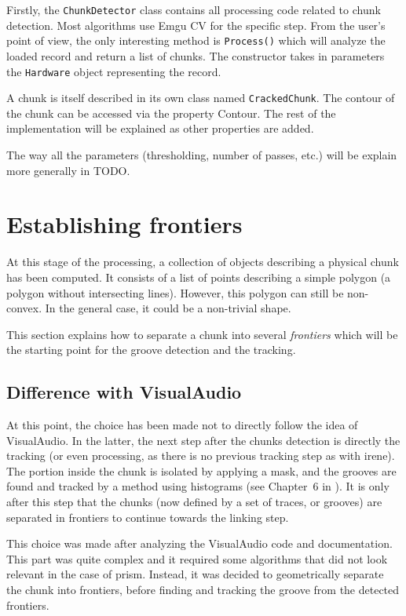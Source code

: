 Firstly, the \texttt{ChunkDetector} class contains all processing code related to chunk detection. Most algorithms use Emgu CV for the specific step. From the user's point of view, the only interesting method is \texttt{Process()} which will analyze the loaded record and return a list of chunks. The constructor takes in parameters the \texttt{Hardware} object representing the record.

A chunk is itself described in its own class named \texttt{CrackedChunk}. The contour of the chunk can be accessed via the property Contour. The rest of the implementation will be explained as other properties are added.

The way all the parameters (thresholding, number of passes, etc.) will be explain more generally in TODO.

\section{Establishing frontiers}
\label{sec:findfrontiers}

At this stage of the processing, a collection of objects describing a physical chunk has been computed. It consists of a list of points describing a simple polygon (a polygon without intersecting lines). However, this polygon can still be non-convex. In the general case, it could be a non-trivial shape.

This section explains how to separate a chunk into several \emph{frontiers} which will be the starting point for the groove detection and the tracking.

\subsection{Difference with VisualAudio}

At this point, the choice has been made not to directly follow the idea of VisualAudio. In the latter, the next step after the chunks detection is directly the tracking (or even processing, as there is no previous tracking step as with \gls{irene}). The portion inside the chunk is isolated by applying a mask, and the grooves are found and tracked by a method using histograms (see Chapter~6 in \cite{seydoux08}). It is only after this step that the chunks (now defined by a set of traces, or grooves) are separated in frontiers to continue towards the linking step.

This choice was made after analyzing the VisualAudio code and documentation. This part was quite complex and it required some algorithms that did not look relevant in the case of \gls{prism}. Instead, it was decided to geometrically separate the chunk into frontiers, before finding and tracking the groove from the detected frontiers.

